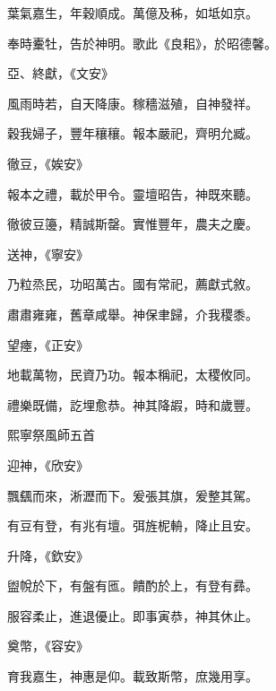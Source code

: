 \begin{pinyinscope}
 葉氣嘉生，年穀順成。萬億及秭，如坻如京。



 奉時櫜牡，告於神明。歌此《良耜》，於昭德馨。



 亞、終獻，《文安》



 風雨時若，自天降康。稼穡滋殖，自神發祥。



 穀我婦子，豐年穰穰。報本嚴祀，齊明允臧。



 徹豆，《娭安》



 報本之禮，載於甲令。靈壇昭告，神既來聽。



 徹彼豆籩，精誠斯罄。實惟豐年，農夫之慶。



 送神，《寧安》



 乃粒烝民，功昭萬古。國有常祀，薦獻式敘。



 肅肅雍雍，舊章咸舉。神保聿歸，介我稷黍。



 望瘞，《正安》



 地載萬物，民資乃功。報本稱祀，太稷攸同。



 禮樂既備，訖埋愈恭。神其降嘏，時和歲豐。



 熙寧祭風師五首



 迎神，《欣安》



 飄颻而來，淅瀝而下。爰張其旗，爰整其駕。



 有豆有登，有兆有壇。弭旌柅輈，降止且安。



 升降，《欽安》



 盥帨於下，有盤有匜。饋酌於上，有登有彞。



 服容柔止，進退優止。即事寅恭，神其休止。



 奠幣，《容安》



 育我嘉生，神惠是仰。載致斯幣，庶幾用享。




\end{pinyinscope}
